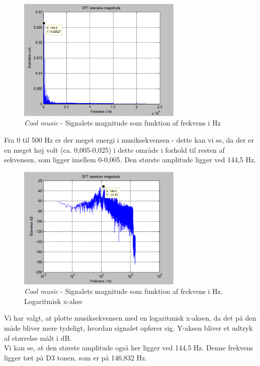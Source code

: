 \begin{figure}[H]
	\centering
	\includegraphics[width=0.7\textwidth]{Figurer/Snip20151001_7}
	\caption{\textit{Cool music} - Signalets magnitude som funktion af frekvens i Hz}
\end{figure}

Fra 0 til 500 Hz er der meget energi i musiksekvensen - dette kan vi se, da der er en meget høj volt (ca. 0,005-0,025) i dette område i forhold til resten af sekvensen, som ligger imellem 0-0,005. Den største amplitude ligger ved 144,5 Hz.      

\begin{figure}[H]
	\centering
	\includegraphics[width=0.7\textwidth]{Figurer/Snip20151001_8}
	\caption{\textit{Cool music} - Signalets magnitude som funktion af frekvens i Hz. Logaritmisk x-akse}
\end{figure}  

Vi har valgt, at plotte musiksekvensen med en logaritmisk x-aksen, da det på den måde bliver mere tydeligt, hvordan signalet opfører sig. Y-aksen bliver et udtryk af størrelse målt i dB. \\
Vi kan se, at den største amplitude også her ligger ved 144,5 Hz. Denne frekvens ligger tæt på D3 tonen, som er på 146,832 Hz.      


